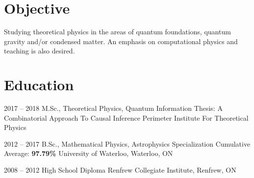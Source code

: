 \documentclass{article}
\begin{document}

    \section{Objective}
    Studying theoretical physics in the areas of quantum foundations, quantum gravity and/or condensed matter. An emphasis on computational physics and teaching is also desired.
    \section{Education}
    \begin{educationlist}
        \item{2017 -- 2018}
            {M.Sc., Theoretical Physics, Quantum Information}
            {Thesis: A Combinatorial Approach To Causal Inference}
            {Perimeter Institute For Theoretical Physics}
        \item{2012 -- 2017}
            {B.Sc., Mathematical Physics, Astrophysics Specialization}
            {Cumulative Average: \textbf{97.79\%}}
            {University of Waterloo, Waterloo, ON}
        \item{2008 -- 2012}
            {High School Diploma}
            {}
            {Renfrew Collegiate Institute, Renfrew, ON}
    \end{educationlist}
\end{document}
